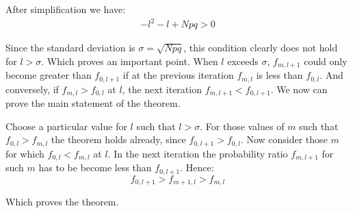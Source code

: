 \documentclass[11pt,draft]{article}
\begin{document}
After simplification we have:
\begin{align}
-l^2 - l +Npq > 0
\end{align}

Since the standard deviation is $\sigma = \sqrt{Npq}$, this condition clearly does not hold for $l>\sigma$.  Which proves an important point. When $l$ exceeds $\sigma$,  $f_{m,l+1}$ could only become greater than $f_{0,l+1}$ if at the previous iteration $f_{m,l}$ is less than $f_{0,l}$.  And conversely, if $f_{m,l} > f_{0,l}$ at $l$, the next iteration $f_{m,l+1} < f_{0,l+1}$.  We now can prove the main statement of the theorem.

Choose a particular value for $l$ such that $l>\sigma$.  For those values of $m$ such that $f_{0,l} > f_{m,l}$ the theorem holds already, since $f_{0,l+1} > f_{0,l}$.  
Now consider those $m$ for which $f_{0,l} < f_{m,l}$ at $l$.  In the next iteration the probability ratio $f_{m,l+1}$ for such $m$ has to be become less than $f_{0,l+1}$.  Hence:
\[ f_{0,l+1} > f_{m+1,l} > f_{m,l} \]

Which proves the theorem.  
\end{document}
